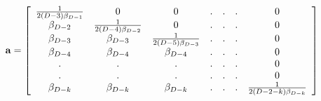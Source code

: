 \begin{equation}
\label{matrix} {\bf a}= \left[\begin{array}{ccccccc}
\frac{1}{2(D-3)\beta_{D-1}}&0&0&.&.&.&0\\ \beta_{D-2}
&\frac{1}{2(D-4)\beta_{D-2}}&0&.&.&.&0\\
\beta_{D-3}&\beta_{D-3}&\frac{1}{2(D-5)\beta_{D-3}}&.&.&.&0\\
\beta_{D-4}&\beta_{D-4}&\beta_{D-4}&. &.&.&0\\.&.&.&.& .&.&0\\.&.&.&.&.&.&0\\
\beta_{D-k}&\beta_{D-k}&\beta_{D-k}&.&.&.&\frac{1}{2(D-2-k)\beta_{D-k}}\\
\end{array}\right] 
\end{equation} 
